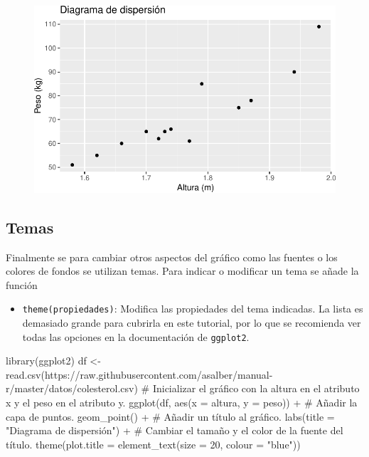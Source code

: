 \documentclass[
  a4paper,
]{scrreport}
\newenvironment{Shaded}{\begin{snugshade}}{\end{snugshade}}
\newcommand{\AttributeTok}[1]{\textcolor[rgb]{0.40,0.45,0.13}{#1}}
\newcommand{\CommentTok}[1]{\textcolor[rgb]{0.37,0.37,0.37}{#1}}
\newcommand{\DecValTok}[1]{\textcolor[rgb]{0.68,0.00,0.00}{#1}}
\newcommand{\FunctionTok}[1]{\textcolor[rgb]{0.28,0.35,0.67}{#1}}
\newcommand{\NormalTok}[1]{\textcolor[rgb]{0.00,0.23,0.31}{#1}}
\newcommand{\OtherTok}[1]{\textcolor[rgb]{0.00,0.23,0.31}{#1}}
\newcommand{\SpecialCharTok}[1]{\textcolor[rgb]{0.37,0.37,0.37}{#1}}
\newcommand{\StringTok}[1]{\textcolor[rgb]{0.13,0.47,0.30}{#1}}
\providecommand{\tightlist}{%
  \setlength{\itemsep}{0pt}\setlength{\parskip}{0pt}}\usepackage{longtable,booktabs,array}
\theoremstyle{definition}
\theoremstyle{definition}
\theoremstyle{remark}
\begin{document}
\begin{figure}[H]

{\centering \includegraphics{./07-graficos_files/figure-pdf/unnamed-chunk-28-1.pdf}

}

\end{figure}

\hypertarget{temas}{%
\subsection{Temas}\label{temas}}

Finalmente se para cambiar otros aspectos del gráfico como las fuentes o
los colores de fondos se utilizan temas. Para indicar o modificar un
tema se añade la función

\begin{itemize}
\tightlist
\item
  \texttt{theme(propiedades)}: Modifica las propiedades del tema
  indicadas. La lista es demasiado grande para cubrirla en este
  tutorial, por lo que se recomienda ver todas las opciones en la
  documentación de \texttt{ggplot2}.
\end{itemize}

\begin{Shaded}
\begin{Highlighting}[]
\FunctionTok{library}\NormalTok{(ggplot2)}
\NormalTok{df }\OtherTok{\textless{}{-}} \FunctionTok{read.csv}\NormalTok{(}\StringTok{\textquotesingle{}https://raw.githubusercontent.com/asalber/manual{-}r/master/datos/colesterol.csv\textquotesingle{}}\NormalTok{)}
\CommentTok{\# Inicializar el gráfico con la altura en el atributo x y el peso en el atributo y.}
\FunctionTok{ggplot}\NormalTok{(df, }\FunctionTok{aes}\NormalTok{(}\AttributeTok{x =}\NormalTok{ altura, }\AttributeTok{y =}\NormalTok{ peso)) }\SpecialCharTok{+}
\CommentTok{\# Añadir la capa de puntos.}
    \FunctionTok{geom\_point}\NormalTok{() }\SpecialCharTok{+}
\CommentTok{\# Añadir un título al gráfico.}
    \FunctionTok{labs}\NormalTok{(}\AttributeTok{title =} \StringTok{"Diagrama de dispersión"}\NormalTok{) }\SpecialCharTok{+}
\CommentTok{\# Cambiar el tamaño y el color de la fuente del título.}
    \FunctionTok{theme}\NormalTok{(}\AttributeTok{plot.title =} \FunctionTok{element\_text}\NormalTok{(}\AttributeTok{size =} \DecValTok{20}\NormalTok{, }\AttributeTok{colour =} \StringTok{"blue"}\NormalTok{))}
\end{Highlighting}
\end{Shaded}
\end{document}
